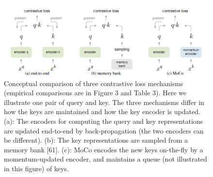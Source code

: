 \documentclass[10pt,twocolumn]{article}  %
\begin{document}
\begin{figure}[htbp]
    \centering
    \includegraphics[width=0.8\linewidth]{Pic/figure2.png} %
    \caption{Conceptual comparison of three contrastive loss mechanisms (empirical comparisons are in Figure 3 and Table 3). Here we
    illustrate one pair of query and key. The three mechanisms differ in how the keys are maintained and how the key encoder is updated.
    (a): The encoders for computing the query and key representations are updated end-to-end by back-propagation (the two encoders can
    be different). (b): The key representations are sampled from a memory bank [61]. (c): MoCo encodes the new keys on-the-ﬂy by a
    momentum-updated encoder, and maintains a queue (not illustrated in this ﬁgure) of keys.} %
    \label{fig:Figure 2} %
\end{figure}
\end{document}
